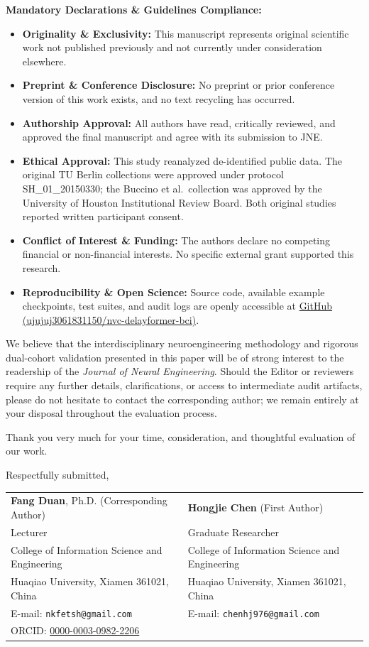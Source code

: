 \documentclass[10pt,a4paper]{article}
\begin{document}
\smallskip
\noindent\textbf{Mandatory Declarations \& Guidelines Compliance:}
\begin{itemize}
  \item \textbf{Originality \& Exclusivity:} This manuscript represents original scientific work not published previously and not currently under consideration elsewhere.
  \item \textbf{Preprint \& Conference Disclosure:} No preprint or prior conference version of this work exists, and no text recycling has occurred.
  \item \textbf{Authorship Approval:} All authors have read, critically reviewed, and approved the final manuscript and agree with its submission to JNE.
  \item \textbf{Ethical Approval:} This study reanalyzed de-identified public data. The original TU Berlin collections were approved under protocol SH\_01\_20150330; the Buccino et al.\ collection was approved by the University of Houston Institutional Review Board. Both original studies reported written participant consent.
  \item \textbf{Conflict of Interest \& Funding:} The authors declare no competing financial or non-financial interests. No specific external grant supported this research.
  \item \textbf{Reproducibility \& Open Science:} Source code, available example checkpoints, test suites, and audit logs are openly accessible at \href{https://github.com/ujujuj3061831150/nvc-delayformer-bci}{GitHub (ujujuj3061831150/nvc-delayformer-bci)}.
\end{itemize}

\smallskip
We believe that the interdisciplinary neuroengineering methodology and rigorous dual-cohort validation presented in this paper will be of strong interest to the readership of the \textit{Journal of Neural Engineering}. Should the Editor or reviewers require any further details, clarifications, or access to intermediate audit artifacts, please do not hesitate to contact the corresponding author; we remain entirely at your disposal throughout the evaluation process.

\smallskip
\noindent Thank you very much for your time, consideration, and thoughtful evaluation of our work.

\smallskip
\noindent Respectfully submitted,\\[0.5ex]
{\small
\noindent
\begin{tabular}{@{}p{}@{\hfill}p{}@{}}
\textbf{Fang Duan}, Ph.D. (Corresponding Author) & \textbf{Hongjie Chen} (First Author) \\
Lecturer & Graduate Researcher \\
College of Information Science and Engineering & College of Information Science and Engineering \\
Huaqiao University, Xiamen 361021, China & Huaqiao University, Xiamen 361021, China \\
E-mail: \texttt{nkfetsh@gmail.com} & E-mail: \texttt{chenhj976@gmail.com} \\
ORCID: \href{https://orcid.org/0000-0003-0982-2206}{0000-0003-0982-2206} & \\
\end{tabular}
}
\end{document}
